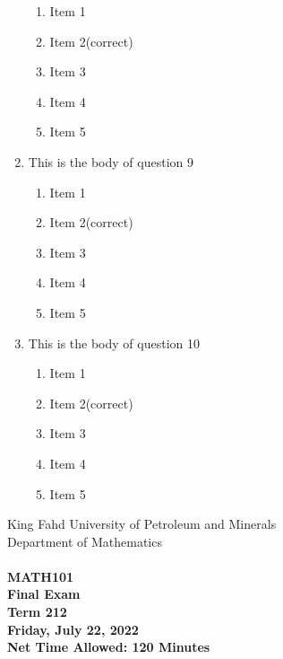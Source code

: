 \documentclass[amsfonts,bezier,leqno,fleqn,12pt,a4paper]{article}
\begin{document}
\begin{large}
\begin{enumerate}
\begin{enumerate}
\item Item 1
\item Item 2\hfill {\small (correct)}
\item Item 3
\item Item 4
\item Item 5

\end{enumerate}
\newpage


\item This is the body of question 9
\vspace {0.3in}
\setcounter{equation}{0}

\begin{enumerate}
\item Item 1
\item Item 2\hfill {\small (correct)}
\item Item 3
\item Item 4
\item Item 5

\end{enumerate}

\vspace {3.5cm}


\item This is the body of question 10
\vspace {0.3in}
\setcounter{equation}{0}

\begin{enumerate}
\item Item 1
\item Item 2\hfill {\small (correct)}
\item Item 3
\item Item 4
\item Item 5

\end{enumerate}
\newpage


\end{enumerate}
\end{large}



\newpage


\thispagestyle{empty}
\begin{center}
    \begin{large}
        King Fahd University of Petroleum and Minerals \\ 
        Department of Mathematics  \\ 
        \vspace*{4.5cm}
        {\bf {} }  \hfill {\bf {}} \\
        {\bf MATH101 }  \\
        {\bf Final Exam }  \\
        {\bf Term 212 }  \\
        {\bf Friday, July 22, 2022 }  \\ 
        {\bf Net Time Allowed: 120 Minutes }  \\
        \vspace*{0.2cm}

    \end{large}
\end{center}
\end{document}
